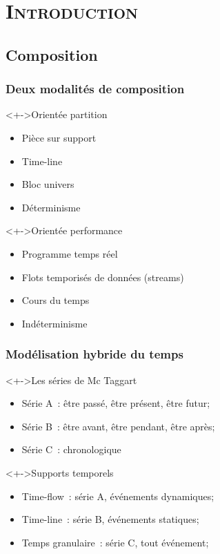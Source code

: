 \section{\scshape Introduction}
\subsection{Composition}
\begin{frame}
	\frametitle{Deux modalités de composition}
	\begin{block}<+->{Orientée partition}
		\begin{itemize}
			\item Pièce sur support
			\item Time-line
			\item Bloc univers
			\item Déterminisme
		\end{itemize}
	\end{block}
	
	\begin{block}<+->{Orientée performance}
		\begin{itemize}
			\item Programme temps réel
			\item Flots temporisés de données (streams)
			\item Cours du temps
			\item Indéterminisme
		\end{itemize}
	\end{block}
\end{frame}


\begin{frame}
	\frametitle{Modélisation hybride du temps}
	\begin{block}<+->{Les séries de Mc Taggart}
		\begin{itemize}
			\item Série A~: être passé, être présent, être futur;
			\item Série B~: être avant, être pendant, être après;
			\item Série C~: chronologique
		\end{itemize}
	\end{block}
	
	\begin{block}<+->{Supports temporels}
		\begin{itemize}
			\item Time-flow~: série A, événements dynamiques;
			\item Time-line~: série B, événements statiques;
			\item Temps granulaire~: série C, tout événement;
		\end{itemize}
	\end{block}
\end{frame}

